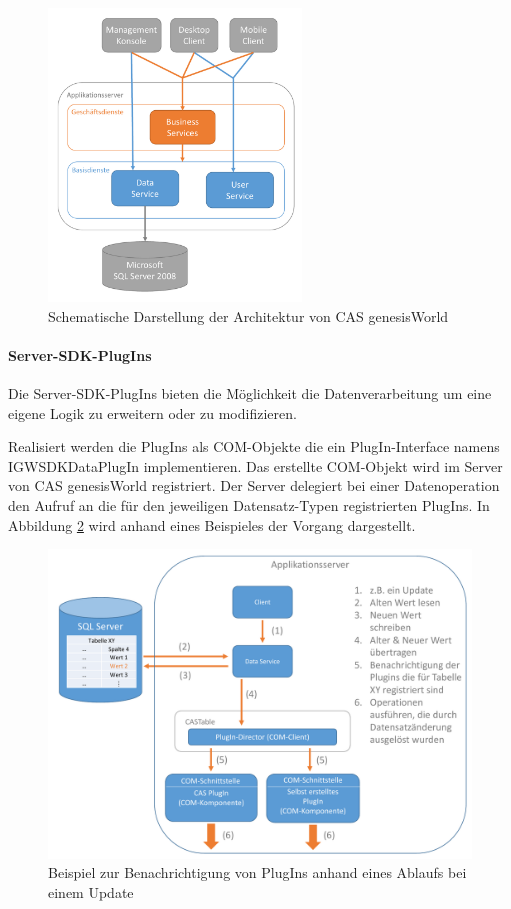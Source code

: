 \begin{figure}[H]
	\centering
  \includegraphics[width=0.6\textwidth, width=0.6\textwidth]{pics/GenesisWorld_Architektur.pdf}
	\caption{Schematische Darstellung der Architektur von CAS genesisWorld}
	\label{gw_Architektur}
\end{figure}

\paragraph{Server-SDK-PlugIns}

Die Server-SDK-PlugIns bieten die Möglichkeit die Datenverarbeitung um eine eigene Logik zu erweitern oder zu modifizieren. 

Realisiert werden die PlugIns als COM-Objekte die ein PlugIn-Interface namens IGWSDKDataPlugIn implementieren. Das erstellte COM-Objekt wird im Server von CAS genesisWorld registriert. Der Server delegiert bei einer Datenoperation den Aufruf an die für den jeweiligen Datensatz-Typen registrierten PlugIns. In Abbildung \ref{gw_plugin} wird anhand eines Beispieles der Vorgang dargestellt.

\begin{figure}[H]
	\centering
  \includegraphics[width=1.0\textwidth, width=1.0\textwidth]{pics/analyse_plugins.pdf}
	\caption{Beispiel zur Benachrichtigung von PlugIns anhand eines Ablaufs bei einem Update}
	\label{gw_plugin}
\end{figure}

